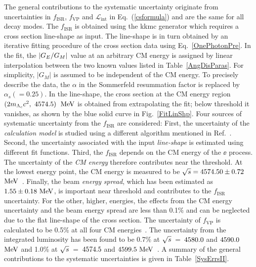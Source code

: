 \documentclass[twocolumn,showpacs,superscriptaddress,amsmath,amssymb]{revtex4-1}
\begin{document}
The general contributions to the systematic uncertainty originate from uncertainties in $f_{\textrm{ISR}}$, $f_{\textrm{VP}}$ and $\mathcal{L}_{\textrm{int}}$ in Eq.~(\ref{csformula}) and are the same for all decay modes. 
The $f_{\textrm{ISR}}$ is obtained using the {\sc kkmc} generator which requires a cross section line-shape as input. The line-shape is in turn obtained by an iterative fitting procedure of the cross section data using Eq.~\eqref{OnePhotonPre}. In the fit, the $|G_{E}/G_{M}|$ value at an arbitrary CM energy is assigned by linear interpolation between the two known values listed in Table~\ref{AngDisParas}. For simplicity, $|G_{M}|$ is assumed to be independent of the CM energy. To precisely describe the data, the $\alpha$ in the Sommerfeld resummation factor is replaced by $\alpha_{s}(=0.25)$. In the line-shape, the cross section at the CM energy region  $(2m_{\Lambda_{c}}c^{2},~4574.5)$~$\mathrm{MeV}$ is obtained from extrapolating the fit; below threshold it vanishes, as shown by the blue solid curve in Fig.~\ref{FitLinShp}. Four sources of systematic uncertainty from the $f_{\textrm{ISR}}$ are considered: First, the uncertainty of the \textit{calculation model} is studied using a different algorithm mentioned in Ref.~\cite{ConExc}. Second, the uncertainty associated with the input \textit{line-shape} is estimated using different fit functions. Third, the $f_{\textrm{ISR}}$ depends on the CM energy of the $\ee$ process. The uncertainty of the \textit{CM energy} therefore contributes near the threshold. At the lowest energy point, the CM energy is measured to be $\sqrt{s}=4574.50\pm0.72$~$\mathrm{MeV}$~\cite{XYZECMS}. Finally, the beam \textit{energy spread}, which has been estimated as  $1.55\pm0.18~\mathrm{MeV}$, is important near threshold and contributes to the $f_{\textrm{ISR}}$ uncertainty. For the other, higher, energies, the effects from the CM energy uncertainty and the beam energy spread are less than 0.1\% and can be neglected due to the flat line-shape of the cross section. The uncertainty of $f_{\textrm{VP}}$ is calculated to be 0.5\% at all four CM energies~\cite{VPfactor}. The uncertainty from the integrated luminosity has been found to be 0.7\% at $\sqrt{s}$~=~$4580.0$ and $4590.0$~$\mathrm{MeV}$ and 1.0\% at $\sqrt{s}$~=~$4574.5$ and $4599.5~\mathrm{MeV}$~\cite{LumXYZ,LumRscan}.  A summary of the general contributions to the systematic uncertainties is given in Table~\ref{SysErrsII}.
\end{document}
